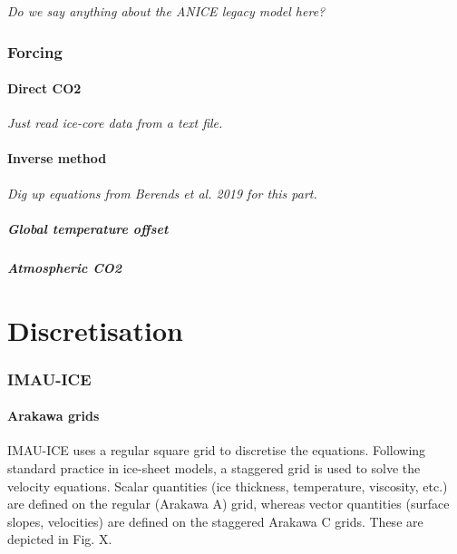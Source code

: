 \documentclass{article}
\begin{document}
\textit{Do we say anything about the ANICE legacy model here?}

\newpage
\section{Forcing}

\subsection{Direct CO2}

\textit{Just read ice-core data from a text file.}

\subsection{Inverse method}

\textit{Dig up equations from Berends et al. 2019 for this part.}

\subsubsection{Global temperature offset}

\subsubsection{Atmospheric CO2}

\newpage
\part{Discretisation}

\section{IMAU-ICE}

\subsection{Arakawa grids}

IMAU-ICE uses a regular square grid to discretise the equations. Following standard practice in ice-sheet models, a staggered grid is used to solve the velocity equations. Scalar quantities (ice thickness, temperature, viscosity, etc.) are defined on the regular (Arakawa A) grid, whereas vector quantities (surface slopes, velocities) are defined on the staggered Arakawa C grids. These are depicted in Fig. X.
\end{document}

